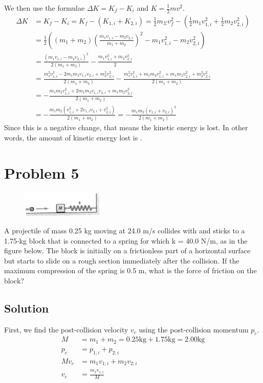 \documentclass[12pt]{article}
\begin{document}
We then use the formulae \( \Delta K = K_f - K_i \) and \( K = \frac{1}{2}mv^2 \).
\begin{align*}
    \Delta K &= K_f - K_i
        =   K_f - (K_{1,i} + K_{2,i})
        =   \frac{1}{2}m_\Sigma v_f^2 - \left(\frac{1}{2}m_1v_{1,i}^2 + \frac{1}{2}m_2v_{2,i}^2\right)\\
        &=  \frac{1}{2}\left( (m_1 + m_2) \left(\frac{m_1 v_{1,i} - m_2 v_{2,i}}{m_1 + m_2}\right)^2 - m_1v_{1,i}^2 - m_2v_{2,i}^2 \right)\\
        &=  \frac{(m_1 v_{1,i} - m_2 v_{2,i})^2}{2(m_1 + m_2)} - \frac{m_1v_{1,i}^2 + m_2v_{2,i}^2}{2}\\
        &=  \frac{m_1^2 v_{1,i}^2 - 2m_1m_2v_{1,i}v_{2,i} + m_2^2 v_{2,i}^2}{2(m_1 + m_2)} - \frac{m_1^2v_{1,i}^2 + m_1m_2v_{1,i}^2 + m_1m_2v_{2,i}^2 + m_2^2v_{2,i}^2}{2(m_1 + m_2)}\\
        &=  -\frac{m_1m_2v_{1,i}^2 + 2m_1m_2v_{1,i}v_{2,i} + m_1m_2v_{2,i}^2}{2(m_1 + m_2)}\\
        &=  -\frac{m_1m_2(v_{1,i}^2 + 2v_{1,i}v_{2,i} + v_{2,i}^2)}{2(m_1 + m_2)}
        =   -\frac{m_1m_2(v_{1,i} + v_{2,i})^2}{2(m_1 + m_2)}
\end{align*}
Since this is a negative change, that means the kinetic energy is lost. In other words, the amount of kinetic energy lost is .

\pagebreak
\section*{Problem 5}
\begin{figure}
    \vspace{-30pt}
    \includegraphics[width=0.35\textwidth]{graph_5.png} 
\end{figure}
A projectile of mass 0.25 kg moving at 24.0 m/s collides with and sticks to a 1.75-kg block that is connected to a spring for which k = 40.0 N/m, as in the figure below. The block is initially on a frictionless part of a horizontal surface but starts to slide on a rough section immediately after the collision. If the maximum compression of the spring is 0.5 m, what is the force of friction on the block?

\subsection*{Solution}
First, we find the post-collision velocity \(v_c\) using the post-collision momentum \(p_c\).
\begin{align*}
    M   &=  m_1 + m_2
        =   0.25\unit{\kilo\gram} + 1.75\unit{\kilo\gram}
        =   2.00\unit{\kilo\gram}\\
    p_c &=  p_{1;i} + p_{2;i}\\
    Mv_c    &=   m_1 v_{1;i} + m_2 v_{2;i}\\
    v_c &=  \frac{m_1 v_{1;i}}{M}
\end{align*}
\end{document}
